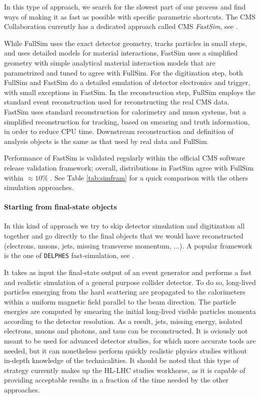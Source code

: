 In this type of approach, we search for the slowest part of our process and find ways of making it as fast as possible with specific parametric shortcuts. The CMS Collaboration currently has a dedicated approach called CMS \emph{FastSim}, see \cite{https://doi.org/10.48550/arxiv.1701.03850}. 

While FullSim uses the exact detector geometry, tracks particles in small steps, and uses
detailed models for material interactions, FastSim uses a simplified geometry with simple analytical material interaction models that are parametrized
and tuned to agree with FullSim. For the digitization step, both FullSim and FastSim do a detailed
emulation of detector electronics and trigger, with small exceptions in FastSim. In the reconstruction step, FullSim employs the standard event reconstruction used for reconstructing the real CMS
data. FastSim uses standard reconstruction for calorimetry and muon systems, but a simplified
reconstruction for tracking, based on smearing and truth information, in order to reduce CPU time. Downstream reconstruction and definition of analysis objects is the same as that used by real data and FullSim.

Performance of FastSim is validated regularly within the official CMS software release validation framework; overall, distributions in FastSim agree with FullSim within $\approx 10\%$ \cite{https://doi.org/10.48550/arxiv.1701.03850}. See Table \ref{tab:simfram} for a quick comparison with the others simulation approaches.

\paragraph{Starting from final-state objects}

In this kind of approach we try to skip detector simulation and digitization all together and go directly to the final objects that we would have reconstructed (electrons, muons, jets, missing transverse momentum, $\dots$). A popular framework is the one of \texttt{DELPHES} fast-simulation, see \cite{de_Favereau_2014}.

It takes as input the final-state output of an event generator and performs a fast and realistic simulation of
a general purpose collider detector. To do so, long-lived particles emerging from the hard
scattering are propagated to the calorimeters within a uniform magnetic field parallel to
the beam direction. The particle energies are computed by smearing the initial long-lived
visible particles momenta according to the detector resolution. As a result, jets, missing
energy, isolated electrons, muons and photons, and taus can be reconstructed. It is oviously not meant to
be used for advanced detector studies, for which more accurate tools are needed, but it can nonetheless perform quickly realistic physics studies without in-depth knowledge of the technicalities. It should be noted that this type of strategy currently makes up the HL-LHC studies workhorse, as it is capable of providing acceptable results in a fraction of the time needed by the other approaches.


